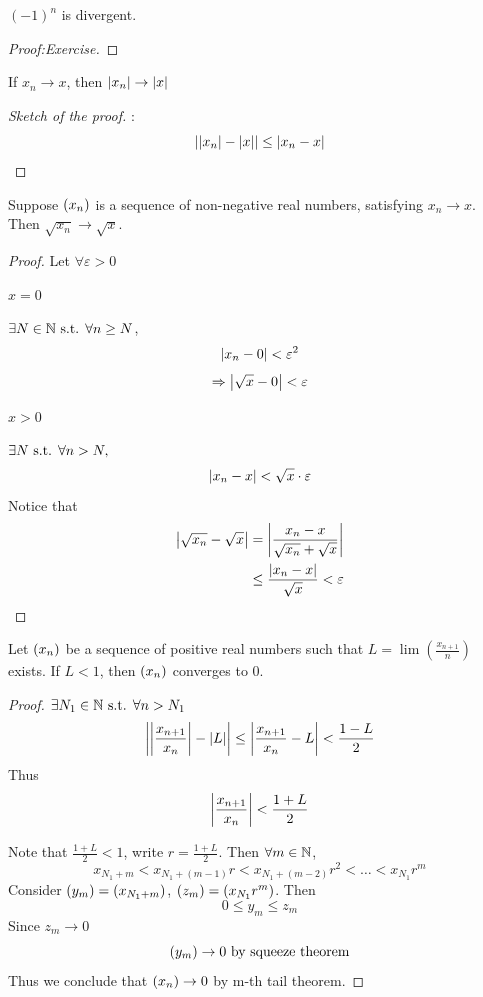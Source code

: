 \documentclass[a4paper,12pt]{article}
\begin{document}
\begin{proposition}
    \((-1)^n\) is divergent.
    \begin{proof}[Proof:Exercise]
        
    \end{proof}
\end{proposition}

\begin{theorem}
    If \(x_n\rightarrow x\), then \(\left\lvert x_n\right\rvert\rightarrow \left\lvert x\right\rvert\)
    \begin{proof}[Sketch of the proof]:
        \[\left\lvert \left\lvert x_n\right\rvert-\left\lvert x\right\rvert\right\rvert\le \left\lvert x_n-x\right\rvert\]
        
    \end{proof}
\end{theorem}

\begin{theorem}
    Suppose \((x_{n})\) is a sequence of non-negative real numbers, satisfying \(x_n\rightarrow x\).
    Then \(\sqrt{x_n}\rightarrow\sqrt{x}\).
    \begin{proof} Let \(\forall \varepsilon>0\)

         \(x=0\)

        \(\exists N\in\mathbb{N} \text{ s.t. } \forall n\ge N\), \[\left\lvert x_n-0\right\rvert<\varepsilon^2\]
        \[\Rightarrow \left\lvert \sqrt{x}-0\right\rvert<\varepsilon\]

         \(x>0\)

        \(\exists N \text{ s.t. } \forall n>N,\) \[\left\lvert x_n-x\right\rvert<\sqrt{x}\cdot\varepsilon\]
        Notice that
        \begin{align*}
            \left\lvert \sqrt{x_n}-\sqrt{x}\right\rvert&=\left\lvert \frac{x_n-x}{\sqrt{x_n}+\sqrt{x}}\right\rvert\\
            &\le \frac{\left\lvert x_n-x\right\rvert}{\sqrt{x}}<\varepsilon
        \end{align*}
    \end{proof}
\end{theorem}

\begin{theorem}
    Let \((x_{n})\) be a sequence of positive real numbers such that \(L=\lim(\frac{x_{n+1}}{n})\) exists. 
    If \(L<1\), then \((x_{n})\) converges to 0.

    \begin{proof}
        \(\exists N_1\in\mathbb{N} \text{ s.t. } \forall n>N_1\)
        \[\left\lvert \left\lvert \frac{x_{n+1}}{x_n}\right\rvert-\left\lvert L\right\rvert\right\rvert\le\left\lvert \frac{x_{n+1}}{x_n}-L\right\rvert<\frac{1-L}{2}\]
        Thus \[\left\lvert \frac{x_{n+1}}{x_n}\right\rvert<\frac{1+L}{2}\]

        Note that \(\frac{1+L}{2}<1\), write \(r=\frac{1+L}{2}\).
        Then \(\forall m\in\mathbb{N}\),
        \[x_{N_1+m}<x_{N_1+(m-1)}r<x_{N_1+(m-2)}r^2<\dots<x_{N_1}r^m\]
        Consider \((y_{m})=(x_{N_1+m})\), \((z_{m})=(x_{N_1}r^m)\). Then 
        \[0\le y_m\le z_m\]
        Since \(z_m\rightarrow 0\)
        \[(y_{m})\rightarrow 0 \text{ by squeeze theorem}\]
        Thus we conclude that \((x_{n})\rightarrow 0\) by m-th tail theorem.
    \end{proof}
\end{theorem}
\end{document}
